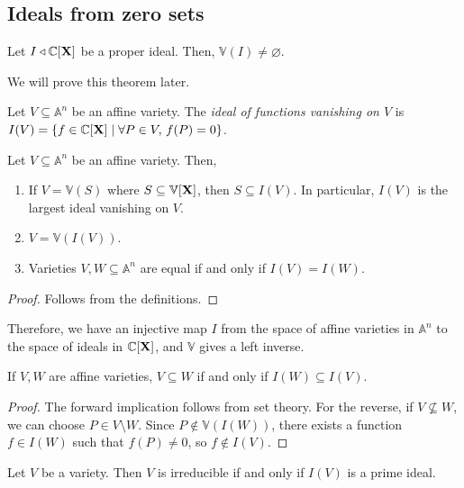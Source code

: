 \subsection{Ideals from zero sets}
\begin{theorem}
    Let \( I \triangleleft \mathbb C[\vb X] \) be a proper ideal.
    Then, \( \mathbb V(I) \neq \varnothing \).
\end{theorem}
We will prove this theorem later.
\begin{definition}
    Let \( V \subseteq \mathbb A^n \) be an affine variety.
    The \emph{ideal of functions vanishing on \( V \)} is \( I(V) = \qty{f \in \mathbb C[\vb X] \mid \forall P \in V,\, f(P) = 0} \).
\end{definition}
\begin{proposition}
    Let \( V \subseteq \mathbb A^n \) be an affine variety.
    Then,
    \begin{enumerate}
        \item If \( V = \mathbb V(S) \) where \( S \subseteq \mathbb V[\vb X] \), then \( S \subseteq I(V) \).
        In particular, \( I(V) \) is the largest ideal vanishing on \( V \).
        \item \( V = \mathbb V(I(V)) \).
        \item Varieties \( V, W \subseteq \mathbb A^n \) are equal if and only if \( I(V) = I(W) \).
    \end{enumerate}
\end{proposition}
\begin{proof}
    Follows from the definitions.
\end{proof}
Therefore, we have an injective map \( I \) from the space of affine varieties in \( \mathbb A^n \) to the space of ideals in \( \mathbb C[\vb X] \), and \( \mathbb V \) gives a left inverse.
\begin{proposition}
    If \( V, W \) are affine varieties, \( V \subseteq W \) if and only if \( I(W) \subseteq I(V) \).
\end{proposition}
\begin{proof}
    The forward implication follows from set theory.
    For the reverse, if \( V \not\subseteq W \), we can choose \( P \in V \setminus W \).
    Since \( P \not\in \mathbb V(I(W)) \), there exists a function \( f \in I(W) \) such that \( f(P) \neq 0 \), so \( f \not\in I(V) \). 
\end{proof}
\begin{proposition}
    Let \( V \) be a variety.
    Then \( V \) is irreducible if and only if \( I(V) \) is a prime ideal.
\end{proposition}
